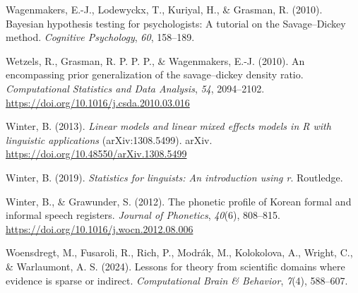 \documentclass[
  doc,
  floatsintext,
  longtable,
  nolmodern,
  notxfonts,
  notimes,
  colorlinks=true,linkcolor=blue,citecolor=blue,urlcolor=blue]{apa7}
\newlength{\cslhangindent}
\newenvironment{CSLReferences}[2] %
 {\begin{list}{}{%
  \setlength{\itemindent}{0pt}
  \setlength{\leftmargin}{0pt}
  \setlength{\parsep}{0pt}
  \ifodd #1
   \setlength{\leftmargin}{\cslhangindent}
   \setlength{\itemindent}{-1\cslhangindent}
  \fi
  \setlength{\itemsep}{#2\baselineskip}}}
 {\end{list}}
\begin{document}
\begin{CSLReferences}{1}{0}
Wagenmakers, E.-J., Lodewyckx, T., Kuriyal, H., \& Grasman, R. (2010).
Bayesian hypothesis testing for psychologists: {A} tutorial on the
{S}avage--{D}ickey method. \emph{Cognitive Psychology}, \emph{60},
158--189.

Wetzels, R., Grasman, R. P. P. P., \& Wagenmakers, E.-J. (2010). An
encompassing prior generalization of the savage--dickey density ratio.
\emph{Computational Statistics and Data Analysis}, \emph{54},
2094--2102. \url{https://doi.org/10.1016/j.csda.2010.03.016}

Winter, B. (2013). \emph{Linear models and linear mixed effects models
in {R} with linguistic applications} (arXiv:1308.5499). arXiv.
\url{https://doi.org/10.48550/arXiv.1308.5499}

Winter, B. (2019). \emph{Statistics for linguists: An introduction using
r}. Routledge.

Winter, B., \& Grawunder, S. (2012). The phonetic profile of {Korean}
formal and informal speech registers. \emph{Journal of Phonetics},
\emph{40}(6), 808--815. \url{https://doi.org/10.1016/j.wocn.2012.08.006}

Woensdregt, M., Fusaroli, R., Rich, P., Modrák, M., Kolokolova, A.,
Wright, C., \& Warlaumont, A. S. (2024). Lessons for theory from
scientific domains where evidence is sparse or indirect.
\emph{Computational Brain \& Behavior}, \emph{7}(4), 588--607.

\end{CSLReferences}
\end{document}
